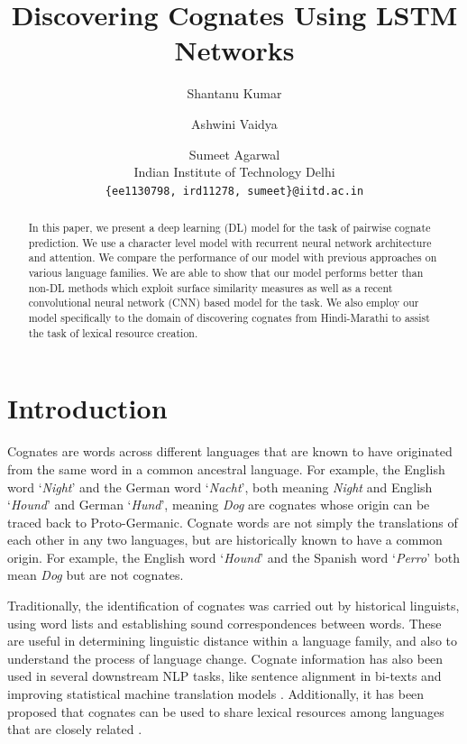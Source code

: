 \documentclass[11pt,letterpaper]{article}
\title{Discovering Cognates Using LSTM Networks}
\author{Shantanu Kumar \and Ashwini Vaidya \and Sumeet Agarwal \\ 
  Indian Institute of Technology Delhi
  \\ {\tt \{ee1130798, ird11278, sumeet\}@iitd.ac.in}}
\date{}
\begin{document}
\maketitle

\begin{abstract}
In this paper, we present a deep learning (DL) model for the task of pairwise cognate prediction. We use a character level model with recurrent neural network architecture and attention. We compare the performance of our model with previous approaches on various language families. We are able to show that our model performs better than non-DL methods which exploit surface similarity measures as well as a recent convolutional neural network (CNN) based model for the task. We also employ our model specifically to the domain of discovering cognates from Hindi-Marathi to assist the task of lexical resource creation.
\end{abstract}

\section{Introduction}
Cognates are words across different languages that are known to have originated from the same word in a common ancestral language. For example, the English word `\textit{Night}' and the German word `\textit{Nacht}', both meaning \textit{Night} and English `\textit{Hound}' and German `\textit{Hund}', meaning \textit{Dog} are cognates whose origin can be traced back to Proto-Germanic. Cognate words are not simply the translations of each other in any two languages, but are historically known to have a common origin. For example, the English word `\textit{Hound}' and the Spanish word `\textit{Perro}' both mean \textit{Dog} but are not cognates.

Traditionally, the identification of cognates was carried out by historical linguists, using word lists and establishing sound correspondences between words. These are useful in determining linguistic distance within a language family, and also to understand the process of language change. Cognate information has also been used in several downstream NLP tasks, like sentence alignment in bi-texts \cite{simard1993using} and improving statistical machine translation models \cite{kondrak2003cognates}. Additionally, it has been proposed that cognates can be used to share lexical resources among languages that are closely related \cite{Singh:07b}.
\end{document}

